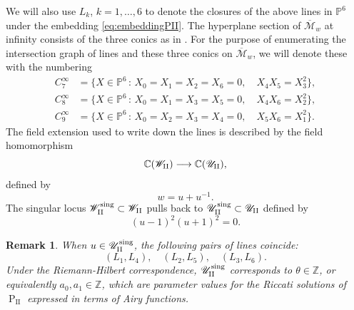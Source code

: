 \documentclass[a4paper,reqno]{amsart}
\numberwithin{equation}{section}
\newcommand{\Z}{\mathbb{Z}}
\newcommand{\C}{\mathbb{C}}
\newcommand{\p}{\mathbb{P}}
\newcommand{\pain}[1]{\operatorname{P}_{\mathrm{#1}}}
\newtheorem{remark}[theorem]{Remark}
\numberwithin{equation}{section}
\begin{document}
We will also use $L_k$, $k=1,\dots,6$ to denote the closures of the above lines in $\p^6$ under the embedding \eqref{eq:embeddingPII}. The hyperplane section of $\overline{\mathcal{M}}_w$ at infinity consists of the three conics as in . 
For the purpose of enumerating the intersection graph of lines and these three conics on $\overline{\mathcal{M}}_w$, we will denote these with the numbering
\begin{equation} \label{eq:conicsatinfinityPII2}
    \begin{aligned}
        C_{7}^{\infty} &= \{ X \in \p^6 \,:\, X_0=X_1=X_2=X_6=0, \quad X_4X_5=X_3^2 \}, \\
        C_{8}^{\infty} &= \{ X \in \p^6 \,:\, X_0=X_1=X_3=X_5=0, \quad X_4X_6=X_2^2 \}, \\
        C_{9}^{\infty} &= \{ X\in \p^6 \,:\, X_0=X_2=X_3=X_4=0, \quad X_5X_6=X_1^2 \}. 
    \end{aligned}
\end{equation}
The field extension used to write down the lines is described by the field homomorphism 
    \begin{equation} \label{lem:morphismUtoWPII}
        \C(\mathscr{W}_{\rm{II}}) \longrightarrow \C(\mathscr{U}_{\rm{II}}),
    \end{equation}
    defined by 
    $$w = u + u^{-1}.$$
The singular locus $\mathscr{W}_{\rm{II}}^{\operatorname{sing}}\subset \mathscr{W}_{\rm{II}}$ pulls back to $\mathscr{U}_{\rm{II}}^{\operatorname{sing}}\subset \mathscr{U}_{\rm{II}}$ defined by 
\begin{equation*}
    (u-1)^2(u+1)^2=0.
\end{equation*}

 \begin{remark}
     When $u\in \mathscr{U}^{\operatorname{sing}}_{\rm{II}}$, the following pairs of lines coincide:
     $$(L_1,L_4),\quad (L_2,L_5), \quad (L_3,L_6).$$
     Under the Riemann-Hilbert correspondence, $\mathscr{U}_{\rm{II}}^{\operatorname{sing}}$ corresponds to $\theta\in\Z$, or equivalently $a_0,a_1\in\Z$, which are parameter values for the Riccati solutions of $\pain{II}$ expressed in terms of Airy functions.
 \end{remark}
\end{document}

